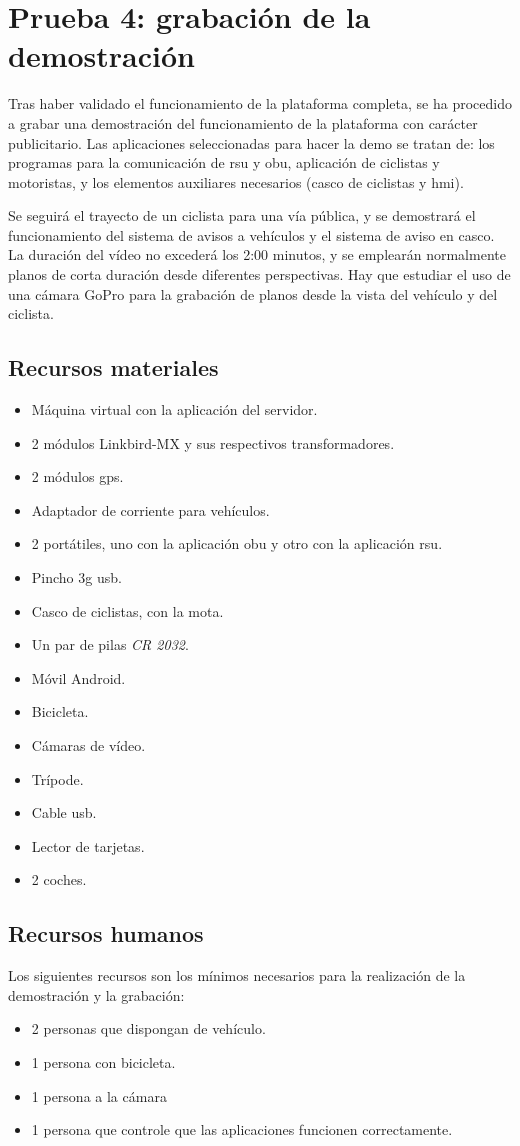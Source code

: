 \section{Prueba 4: grabación de la demostración}
Tras haber validado el funcionamiento de la plataforma completa, se ha
procedido a grabar una demostración del funcionamiento de la plataforma con
carácter publicitario. Las aplicaciones seleccionadas para hacer la demo se
tratan de: los programas para la comunicación de \gls{rsu} y \gls{obu},
aplicación de ciclistas y motoristas, y los elementos auxiliares necesarios
(casco de ciclistas y \gls{hmi}).

Se seguirá el trayecto de un ciclista para una vía pública, y se demostrará el
funcionamiento del sistema de avisos a vehículos y el sistema de aviso en
casco. La duración del vídeo no excederá los 2:00 minutos, y se emplearán
normalmente planos de corta duración desde diferentes perspectivas. Hay que
estudiar el uso de una cámara GoPro para la grabación de planos desde la vista
del vehículo y del ciclista.

\subsection{Recursos materiales}
\begin{itemize}
	\item Máquina virtual con la aplicación del servidor.
	\item 2 módulos Linkbird-MX y sus respectivos transformadores.
	\item 2 módulos \gls{gps}.
	\item Adaptador de corriente para vehículos.
	\item 2 portátiles, uno con la aplicación \gls{obu} y otro con la
	aplicación \gls{rsu}.
	\item Pincho \gls{3g} \gls{usb}.
	\item Casco de ciclistas, con la mota.
	\item Un par de pilas \emph{CR 2032}.
	\item Móvil Android.
	\item Bicicleta.
	\item Cámaras de vídeo.
	\item Trípode.
	\item Cable \gls{usb}.
	\item Lector de tarjetas.
	\item 2 coches.
\end{itemize}

\subsection{Recursos humanos}
Los siguientes recursos son los mínimos necesarios para la realización de
la demostración y la grabación:
\begin{itemize}
	\item 2 personas que dispongan de vehículo.
	\item 1 persona con bicicleta.
	\item 1 persona a la cámara
	\item 1 persona que controle que las aplicaciones funcionen correctamente.
\end{itemize}

